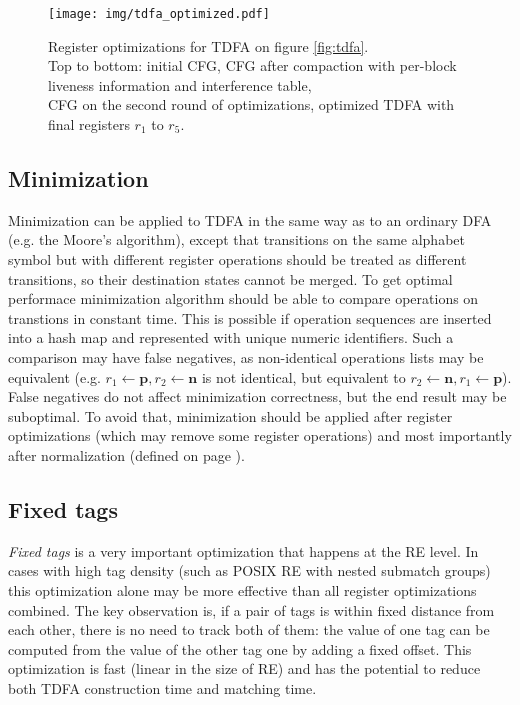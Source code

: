 \documentclass[]{article}
\begin{document}
\begin{figure}[]
\texttt{[image: img/tdfa\_optimized.pdf]}
\vspace{0.5em}
\caption{
Register optimizations for TDFA on figure \ref{fig:tdfa}. \\
Top to bottom: initial CFG,
CFG after compaction with per-block liveness information and interference table,\\
CFG on the second round of optimizations,
optimized TDFA with final registers $r_1$ to $r_5$.
}\label{fig:tdfa_regopt}
\end{figure}

\subsection{Minimization}

Minimization can be applied to TDFA in the same way as to an ordinary DFA (e.g. the Moore's algorithm),
except that transitions on the same alphabet symbol but with different register operations
should be treated as different transitions, so their destination states cannot be merged.
To get optimal performace minimization algorithm should be able to compare operations on transtions in constant time.
This is possible if operation sequences are inserted into a hash map and represented with unique numeric identifiers.
Such a comparison may have false negatives, as non-identical operations lists may be equivalent
(e.g. $r_1 \leftarrow \mathbf{p}, r_2 \leftarrow \mathbf{n}$ is not identical, but equivalent to $r_2 \leftarrow \mathbf{n}, r_1 \leftarrow \mathbf{p}$).
False negatives do not affect minimization correctness, but the end result may be suboptimal.
To avoid that, minimization should be applied after register optimizations (which may remove some register operations)
and most importantly after normalization (defined on page \pageref{alg_opt2}).

\subsection{Fixed tags}

\newcommand\nan{N\!an}
\newcommand\nobasetag{-1}%

\emph{Fixed tags} is a very important optimization that happens at the RE level.
In cases with high tag density (such as POSIX RE with nested submatch groups)
this optimization alone may be more effective than all register optimizations combined.
%
The key observation is,
if a pair of tags is within fixed distance from each other, there is no need to track both of them:
the value of one tag can be computed from the value of the other tag one by adding a fixed offset.
%
This optimization is fast (linear in the size of RE)
and has the potential to reduce both TDFA construction time and matching time.
\medskip
\end{document}
